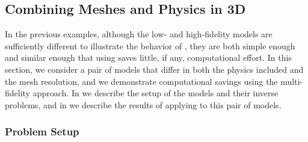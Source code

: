 \documentclass[review,sort&compress]{elsarticle}
\providecommand{\DIFaddend}{} %
\DeclareRobustCommand{\DIFaddend}{\DIFOaddend \let\includegraphics\DIFOincludegraphics} %
\begin{document}
\DIFaddend %
\subsection{Combining Meshes and Physics in 3D} \label{sec:diffvcdr3D}

In the previous examples, although the low- and high-fidelity models are sufficiently different to illustrate the behavior of , they are both simple enough and similar enough that using  saves little, if any, computational effort. In this section, we consider a pair of models that differ in both the physics included and the mesh resolution, and we demonstrate computational savings using the multi-fidelity approach. In  we describe the setup of the models and their inverse problems, and in  we describe the results of applying  to this pair of models.

\subsubsection{Problem Setup} \label{sec:setup3D_diffmesh}
\end{document}
